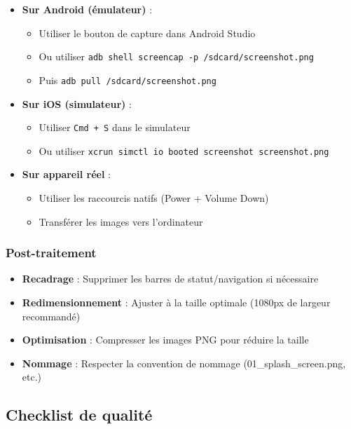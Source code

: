 \documentclass[a4paper,11pt]{report}
\begin{document}
\begin{itemize}
    \item \textbf{Sur Android (émulateur)} :
    \begin{itemize}
        \item Utiliser le bouton de capture dans Android Studio
        \item Ou utiliser \texttt{adb shell screencap -p /sdcard/screenshot.png}
        \item Puis \texttt{adb pull /sdcard/screenshot.png}
    \end{itemize}
    
    \item \textbf{Sur iOS (simulateur)} :
    \begin{itemize}
        \item Utiliser \texttt{Cmd + S} dans le simulateur
        \item Ou utiliser \texttt{xcrun simctl io booted screenshot screenshot.png}
    \end{itemize}
    
    \item \textbf{Sur appareil réel} :
    \begin{itemize}
        \item Utiliser les raccourcis natifs (Power + Volume Down)
        \item Transférer les images vers l'ordinateur
    \end{itemize}
\end{itemize}

\subsubsection{Post-traitement}

\begin{itemize}
    \item \textbf{Recadrage} : Supprimer les barres de statut/navigation si nécessaire
    \item \textbf{Redimensionnement} : Ajuster à la taille optimale (1080px de largeur recommandé)
    \item \textbf{Optimisation} : Compresser les images PNG pour réduire la taille
    \item \textbf{Nommage} : Respecter la convention de nommage (01\_splash\_screen.png, etc.)
\end{itemize}

\subsection{Checklist de qualité}
\end{document}
